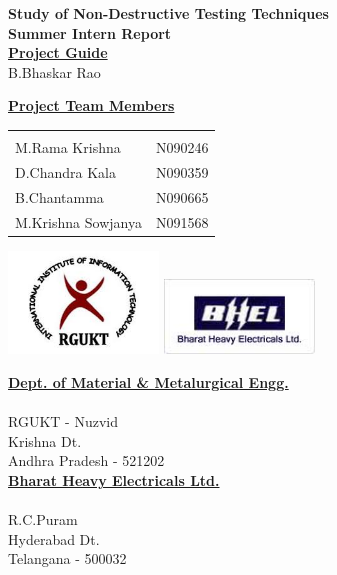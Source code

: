 \documentclass[12pt]{report}
\begin{document}
\begin{titlepage}
 \begin{center}
\Huge
\textbf{Study of Non-Destructive Testing Techniques} \\
\vfill
\LARGE
\textbf{Summer Intern Report}\\
\vfill
\LARGE
\underline{\textbf{Project Guide}} \\ 
B.Bhaskar Rao \\
\vfill

\Large
\underline{\textbf{Project Team Members}}  \\ 
\normalsize
\begin{tabular}{l l}
 & \\
M.Rama Krishna		& N090246 \\
D.Chandra Kala 		& N090359 \\
B.Chantamma   		& N090665 \\
M.Krishna Sowjanya	& N091568 \\
\end{tabular}
\vfill
\includegraphics[width=4cm]{rgukt_logo.jpg}
\includegraphics[width=4cm]{bhel_logo.jpeg}
\vfill

\begin{multicols}{2}


\underline{\textbf{Dept. of Material \& Metalurgical Engg.}} \\
\hspace{2cm}  \\
\indent RGUKT - Nuzvid \\
\indent Krishna Dt. \\
\indent Andhra Pradesh - 521202 \\




\underline{\textbf{Bharat Heavy Electricals Ltd.}} \\
\hspace{2cm} \\
R.C.Puram\\
Hyderabad Dt. \\
Telangana - 500032 \\



\end{multicols}
\end{center}
\end{titlepage}
\end{document}
